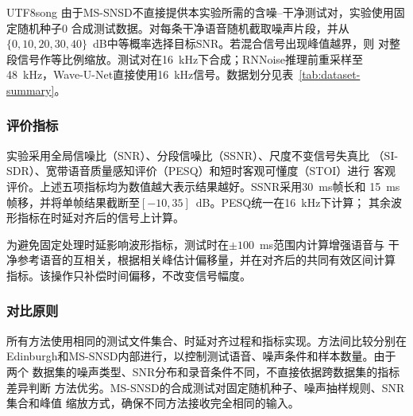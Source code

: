 \documentclass[10.5pt,compsoc]{CjC}
\theoremstyle{mystyle}
\begin{document}
\begin{CJK*}{UTF8}{song}
由于MS-SNSD不直接提供本实验所需的含噪--干净测试对，实验使用固定随机种子0
合成测试数据。对每条干净语音随机截取噪声片段，并从
$\{0,10,20,30,40\}$~dB中等概率选择目标SNR。若混合信号出现峰值越界，则
对整段信号作等比例缩放。测试对在16~kHz下合成；RNNoise推理前重采样至
48~kHz，Wave-U-Net直接使用16~kHz信号。数据划分见表~\ref{tab:dataset-summary}。

\begin{table}[htbp]
\centering
\caption{数据集划分与测试条件}
\label{tab:dataset-summary}
\vspace{1mm}
{
\renewcommand{\arraystretch}{1.25}
\setlength{\tabcolsep}{3pt}
}
\end{table}

\subsubsection{评价指标}

实验采用全局信噪比（SNR）、分段信噪比（SSNR）、尺度不变信号失真比
（SI-SDR）、宽带语音质量感知评价（PESQ）和短时客观可懂度（STOI）进行
客观评价。上述五项指标均为数值越大表示结果越好。SSNR采用30~ms帧长和
15~ms帧移，并将单帧结果截断至$[-10,35]$~dB。PESQ统一在16~kHz下计算；
其余波形指标在时延对齐后的信号上计算。

为避免固定处理时延影响波形指标，测试时在$\pm100$~ms范围内计算增强语音与
干净参考语音的互相关，根据相关峰估计偏移量，并在对齐后的共同有效区间计算
指标。该操作只补偿时间偏移，不改变信号幅度。

\subsubsection{对比原则}

所有方法使用相同的测试文件集合、时延对齐过程和指标实现。方法间比较分别在
Edinburgh和MS-SNSD内部进行，以控制测试语音、噪声条件和样本数量。由于两个
数据集的噪声类型、SNR分布和录音条件不同，不直接依据跨数据集的指标差异判断
方法优劣。MS-SNSD的合成测试对固定随机种子、噪声抽样规则、SNR集合和峰值
缩放方式，确保不同方法接收完全相同的输入。


\end{CJK*}
\end{document}
